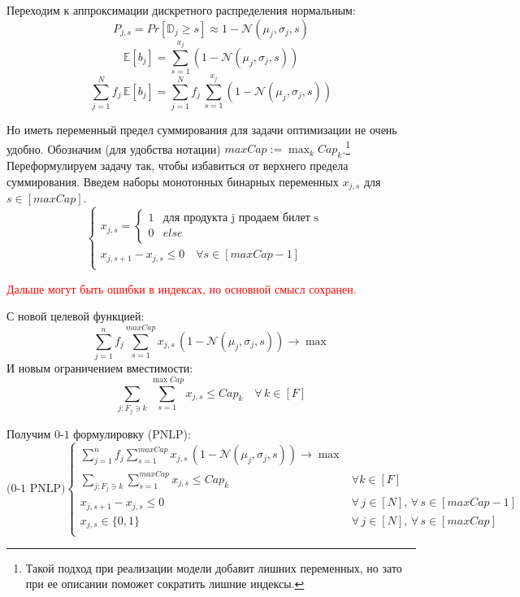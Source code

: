 \documentclass[reqno]{article}
\theoremstyle{definition}
\theoremstyle{definition}
\theoremstyle{definition}
\theoremstyle{definition}
\theoremstyle{definition}
\theoremstyle{definition}
\theoremstyle{definition}
\theoremstyle{definition}
\theoremstyle{definition}
\begin{document}
		Переходим к аппроксимации дискретного распределения нормальным:
		$$P_{j,s} = Pr[\mathds{D}_j \geq s] \approx 1 - \mathcal{N}(\mu_j, \sigma_j, s)$$
		$$\mathds{E}[b_j] = \sum\limits_{s = 1}^{x_j} (1 - \mathcal{N}(\mu_j, \sigma_j, s))$$
		$$\sum\limits^N_{j = 1} f_j\,\mathds{E}[b_j] = \sum\limits^N_{j = 1} f_j\,\sum\limits_{s = 1}^{x_j} (1 - \mathcal{N}(\mu_j, \sigma_j, s))$$
		
		Но иметь переменный предел суммирования для задачи оптимизации не очень удобно. Обозначим (для удобства нотации) $maxCap := \max_k Cap_k$.\footnote{Такой подход при реализации модели добавит лишних переменных, но зато при ее описании поможет сократить лишние индексы.} Переформулируем задачу так, чтобы избавиться от верхнего предела суммирования. Введем наборы монотонных бинарных переменных $x_{j,s}$ для $s \in [maxCap]$.
		$$
		\begin{cases}
			x_{j,s} =
		\begin{cases}
			1 & \text{для продукта j продаем билет s}\\
			0 & else\\
		\end{cases} & \\
		x_{j,s + 1} - x_{j, s} \leq 0\quad \forall s \in [maxCap - 1] & \\
		\end{cases}
		$$
		
		\textcolor{red}{Дальше могут быть ошибки в индексах, но основной смысл сохранен.}
		
		С новой целевой функцией:
		$$\sum\limits^n_{j = 1} f_j \sum\limits^{maxCap}_{s = 1} x_{j, s}\,(1 - \mathcal{N}(\mu_j, \sigma_j, s)) \rightarrow \max$$
		И новым ограничением вместимости:
		$$\sum\limits_{j : F_j \ni k} \sum\limits^{\max Cap}_{s = 1} x_{j, s} \leq Cap_k \quad \forall\, k \in [F]$$
		
		Получим $0$-$1$ формулировку (PNLP):
		$$
		\text{(0-1 PNLP)}
		\begin{cases}
			\sum\limits^n_{j = 1} f_j \sum\limits^{maxCap}_{s = 1} x_{j, s}\,(1 - \mathcal{N}(\mu_j, \sigma_j, s)) \rightarrow \max & \\
			\sum\limits_{j : F_j \ni k} \sum\limits^{maxCap}_{s = 1} x_{j, s} \leq Cap_k & \forall k \in [F] \\
			x_{j,s + 1} - x_{j, s} \leq 0 \quad & \forall\, j \in [N],\, \forall\, s \in [maxCap - 1] \\
			x_{j, s} \in \{0, 1\} &  \forall\, j \in [N],\, \forall\, s \in [maxCap] \\
		\end{cases}
		$$
		
\end{document}
